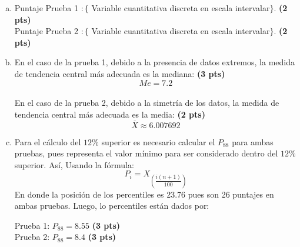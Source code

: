 \begin{solution}
\begin{enumerate}[a)]
\item Puntaje Prueba 1 $:\{$ Variable cuantitativa discreta en escala intervalar$\}$.  \textbf{(2 pts)}\\
Puntaje Prueba 2 $:\{$ Variable cuantitativa discreta en escala intervalar$\}$.  \textbf{(2 pts)}\\

\item En el caso de la prueba 1, debido a la presencia de datos extremos, la medida de tendencia central más adecuada es la mediana: \textbf{(3 pts)} $$Me=7.2$$ \\
En el caso de la prueba 2, debido a la simetría de los datos, la medida de tendencia central más adecuada es la media: \textbf{(2 pts)} $$\overline{X}\approx 6.007692$$ 
\item Para el cálculo del $12\%$ superior es necesario calcular el $P_{88}$ para ambas pruebas, pues representa el valor mínimo para ser considerado dentro del $12\%$ superior. Así, Usando la fórmula:
$$P_i=X_{\left(\dfrac{i(n+1)}{100}\right)}$$
En donde la posición de los percentiles es 23.76 pues son 26 puntajes en ambas pruebas. Luego, lo percentiles están dados por:
\begin{center}
Prueba 1: $P_{88}= 8.55$ \textbf{(3 pts)}\\
Prueba 2: $P_{88}= 8.4$ \textbf{(3 pts)}
\end{center}
\end{enumerate}
\end{solution}